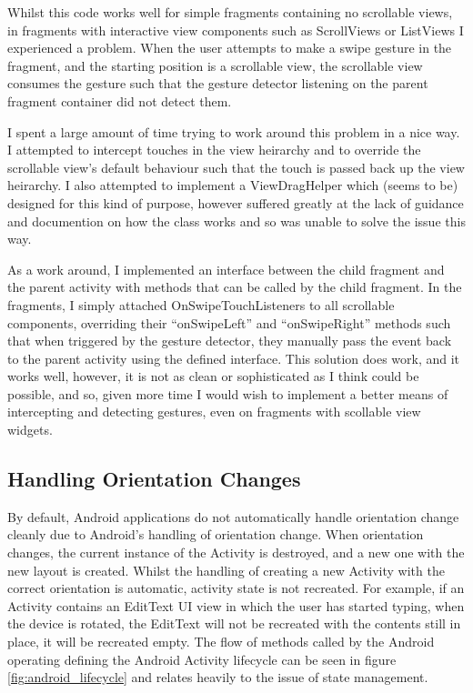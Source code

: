 Whilst this code works well for simple fragments containing no scrollable views, in fragments with interactive view components such as ScrollViews\cite{androidScrollView} or ListViews\cite{androidListView} I experienced a problem.  When the user attempts to make a swipe gesture in the fragment, and the starting position is a scrollable view, the scrollable view consumes the gesture such that the gesture detector listening on the parent fragment container did not detect them.

I spent a large amount of time trying to work around this problem in a nice way.  I attempted to intercept touches in the view heirarchy and to override the scrollable view's default behaviour such that the touch is passed back up the view heirarchy.  I also attempted to implement a ViewDragHelper\cite{androidViewDragHelper} which (seems to be) designed for this kind of purpose, however suffered greatly at the lack of guidance and documention on how the class works and so was unable to solve the issue this way.

As a work around, I implemented an interface between the child fragment and the parent activity with methods that can be called by the child fragment.  In the fragments, I simply attached OnSwipeTouchListeners to all scrollable components, overriding their ``onSwipeLeft'' and ``onSwipeRight'' methods such that when triggered by the gesture detector, they manually pass the event back to the parent activity using the defined interface.  This solution does work, and it works well, however, it is not as clean or sophisticated as I think could be possible, and so, given more time I would wish to implement a better means of intercepting and detecting gestures, even on fragments with scollable view widgets.

\FloatBarrier

\subsection{Handling Orientation Changes}
\label{subs:handling_orientation_changes}

By default, Android applications do not automatically handle orientation change cleanly due to Android's handling of orientation change.  When orientation changes, the current instance of the Activity is destroyed, and a new one with the new layout is created.  Whilst the handling of creating a new Activity with the correct orientation is automatic, activity state is not recreated.  For example, if an Activity contains an EditText\cite{androidEditText} UI view in which the user has started typing, when the device is rotated, the EditText will not be recreated with the contents still in place, it will be recreated empty.  The flow of methods called by the Android operating defining the Android Activity lifecycle can be seen in figure \ref{fig:android_lifecycle} and relates heavily to the issue of state management.

